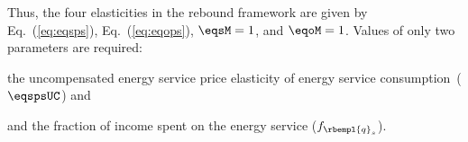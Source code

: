 Thus, the four elasticities in the rebound framework are given by
Eq.~(\ref{eq:eqsps}), 
Eq.~(\ref{eq:eqops}), 
$\eqsM = 1$, and 
$\eqoM = 1$.
Values of only two parameters are required:
%
\begin{enumerate*}[label={(\alph*)}]
	
  \item the uncompensated energy service price elasticity of energy service consumption~($\eqspsUC$) and
  
  \item and the fraction of income spent on the energy service ($f_{\rbempl{q}_s}$).
    
\end{enumerate*}

